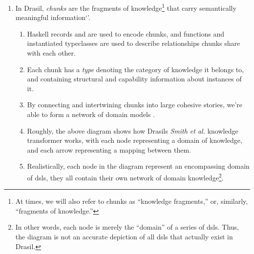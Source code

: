 \begin{enumerate}
\begin{enumerate}
                  \item Drasil relies on a \textit{network of domains} (a
                        network of domain knowledge connected by \aclp{dsl}) to
                        enable the complex information transformation needed to
                        convert an \acs{srs} document into code.

            \end{enumerate}

      \item In Drasil, \textit{chunks} are the fragments of
            knowledge\footnote{At times, we will also refer to chunks as
                  ``knowledge fragments,'' or, similarly, ``fragments of knowledge.''}
            that carry semantically meaningful information`'.
            \begin{enumerate}
                  \item Haskell records and  are used to encode
                        chunks, and functions and instantiated typeclasses are
                        used to describe relationships chunks share with each
                        other.

                  \item Each chunk has a \textit{type} denoting the category of
                        knowledge it belongs to, and containing structural and
                        capability information about instances of it.

                  \item By connecting and intertwining chunks into large
                        cohesive stories, we're able to form a network of domain
                        models \cite{Czarnecki2005}.

                  \item Roughly, the above diagram shows how Drasils
                        \textit{Smith et al.} knowledge transformer works, with
                        each node representing a domain of knowledge, and each
                        arrow representing a mapping between them.

                  \item Realistically, each node in the diagram represent an
                        encompassing domain of \acsp{dsl}, they all contain
                        their own network of domain knowledge\footnote{In other
                              words, each node is merely the ``domain'' of a series of
                              \acsp{dsl}. Thus, the diagram is not an accurate
                              depiction of all \acsp{dsl} that actually exist in
                              Drasil.}.
            \end{enumerate}


\end{enumerate}
